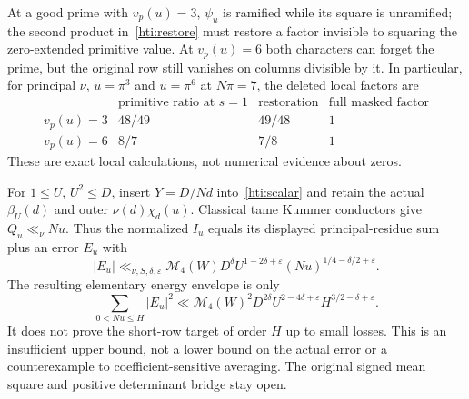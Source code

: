 At a good prime with $v_p(u)=3$, $\psi_u$ is ramified while its square
is unramified; the second product in~\eqref{hti:restore} must restore a
factor invisible to squaring the zero-extended primitive value.
At $v_p(u)=6$ both characters can forget the prime, but the original row
still vanishes on columns divisible by it. In particular, for principal
$\nu$, $u=\pi^3$ and $u=\pi^6$ at $N\pi=7$, the deleted local factors are
\[
\begin{array}{c|ccc}
 &\text{primitive ratio at }s=1&\text{restoration}&\text{full masked factor}\\\hline
v_p(u)=3&48/49&49/48&1\\
v_p(u)=6&8/7&7/8&1
\end{array}
\]
These are exact local calculations, not numerical evidence about zeros.

For $1\le U$, $U^2\le D$, insert $Y=D/Nd$ into~\eqref{hti:scalar}
and retain the actual $\beta_U(d)$ and outer $\nu(d)\chi_d(u)$.
Classical tame Kummer conductors give $Q_u\ll_\nu Nu$. Thus the normalized
$I_u$ equals its displayed principal-residue sum plus an error $E_u$ with
\begin{equation}\label{hti:outer}
 |E_u|\ll_{\nu,S,\delta,\varepsilon}\mathcal M_4(W)
 D^\delta U^{1-2\delta+\varepsilon}
 (Nu)^{1/4-\delta/2+\varepsilon}.
\end{equation}
The resulting elementary energy envelope is only
\begin{equation}\label{hti:energy}
 \sum_{0<Nu\le H}|E_u|^2
 \ll\mathcal M_4(W)^2D^{2\delta}U^{2-4\delta+\varepsilon}
 H^{3/2-\delta+\varepsilon}.
\end{equation}
It does not prove the short-row target of order $H$ up to small losses.
This is an insufficient upper bound, not a lower bound on the actual
error or a counterexample to coefficient-sensitive averaging. The
original signed mean square and positive determinant bridge stay open.
